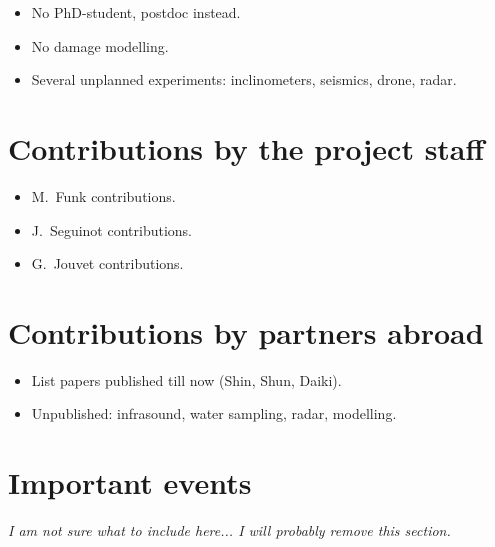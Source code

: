 \documentclass{article}
\begin{document}
\begin{itemize}
\item No PhD-student, postdoc instead.
\item No damage modelling.
\item Several unplanned experiments: inclinometers, seismics, drone, radar.
\end{itemize}

\section{Contributions by the project staff}

\begin{itemize}
\item M.~Funk contributions.
\item J.~Seguinot contributions.
\item G.~Jouvet contributions.
\end{itemize}

\section{Contributions by partners abroad}

\begin{itemize}
\item List papers published till now (Shin, Shun, Daiki).
\item Unpublished: infrasound, water sampling, radar, modelling.
\end{itemize}

\section{Important events}

\emph{I am not sure what to include here...
      I will probably remove this section.}

\end{document}
